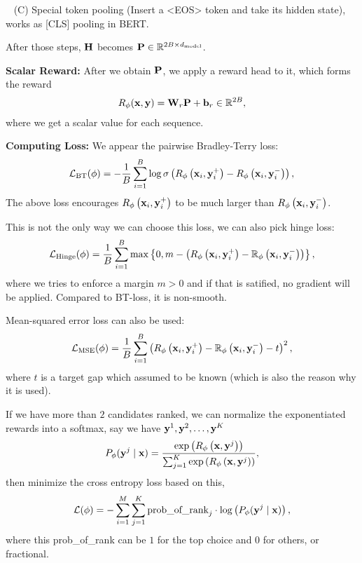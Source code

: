 \documentclass[11pt]{article}  %
\begin{document}
\textbullet~ (C) Special token pooling (Insert a <EOS> token and take its hidden state), works as [CLS] pooling in BERT.

After those steps, $\mathbf{H}$ becomes $\mathbf{P} \in \mathbb{R}^{2B \times d_{\text{model}}}$.

\textbf{Scalar Reward:} After we obtain $\mathbf{P}$, we apply a reward head to it, which forms the reward 
\begin{align*}
  R_{\phi}(\mathbf{x}, \mathbf{y}) = \mathbf{W}_r \mathbf{P} + \mathbf{b}_r \in \mathbb{R}^{2B},
\end{align*}
where we get a scalar value for each sequence.

\textbf{Computing Loss:} We appear the pairwise Bradley-Terry loss: 
\begin{align*}
  \mathcal{L}_{\text{BT}}(\phi) = -\frac{1}{B}\sum_{i=1}^{B}\log \sigma\left( R_{\phi}\left( \mathbf{x}_i, \mathbf{y}_i^+ \right) - R_\phi\left( \mathbf{x}_i, \mathbf{y}_i^- \right) \right),
\end{align*}
The above loss encourages $R_{\phi}\left( \mathbf{x}_i, \mathbf{y}_i^+ \right)$ to be much larger than $R_{\phi}\left( \mathbf{x}_i, \mathbf{y}_i^- \right)$.

This is not the only way we can choose this loss, we can also pick hinge loss:
\begin{align*}
  \mathcal{L}_{\text{Hinge}}(\phi) = \frac{1}{B}\sum_{i=1}^{B} \max\left\{ 0, m - \left( R_{\phi}\left( \mathbf{x}_i, \mathbf{y}_i^+ \right) - \mathbb{R}_\phi\left( \mathbf{x}_i, \mathbf{y}_i^- \right) \right) \right\},
\end{align*}
where we tries to enforce a margin $m > 0$ and if that is satified, no gradient will be applied.
Compared to BT-loss, it is non-smooth.

Mean-squared error loss can also be used:
\begin{align*}
  \mathcal{L}_{\text{MSE}}(\phi) = \frac{1}{B}\sum_{i=1}^{B}\left( R_{\phi}\left( \mathbf{x}_i, \mathbf{y}_i^+ \right) - \mathbb{R}_\phi\left( \mathbf{x}_i, \mathbf{y}_i^- \right) - t \right)^2,
\end{align*}
where $t$ is a target gap which assumed to be known (which is also the reason why it is used).

If we have more than $2$ candidates ranked, we can normalize the exponentiated rewards into a softmax, say we have $\mathbf{y}^1, \mathbf{y}^2, \hdots, \mathbf{y}^K$ 
\begin{align*}
  P_{\phi}(\mathbf{y}^j \mid \mathbf{x}) = \frac{\exp\left( R_{\phi}\left( \mathbf{x}, \mathbf{y}^j \right) \right)}{\sum_{j=1}^{K}\exp\left( R_{\phi}\left( \mathbf{x}, \mathbf{y}^j \right) \right)},
\end{align*}
then minimize the cross entropy loss based on this,
\begin{align*}
  \mathcal{L} (\phi) = - \sum_{i=1}^M\sum_{j=1}^{K} \text{prob\_of\_rank}_j \cdot \log \left( P_{\phi}(\mathbf{y}^j \mid \mathbf{x}) \right), 
\end{align*}
where this prob\_of\_rank can be $1$ for the top choice and $0$ for others, or fractional.
\end{document}
